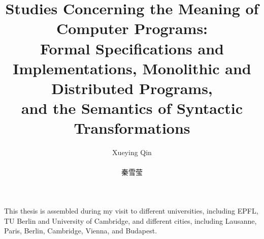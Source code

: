 \documentclass[phd,icsa,twoside,logo]{infthesis}
\title{Studies Concerning the Meaning of Computer Programs:\\\smaller Formal Specifications and Implementations, Monolithic and Distributed Programs,\\and the Semantics of Syntactic Transformations}
\author{Xueying Qin \\ \begin{CJK*}{UTF8}{gbsn}秦雪莹\end{CJK*}}
\begin{document}
\begin{preliminary}

\maketitle
\begin{laysummary}

\end{laysummary}


\begin{acknowledgements}
This thesis is assembled during my visit to different universities, including EPFL, TU Berlin and University of Cambridge, and different cities, including Lausanne, Paris, Berlin, Cambridge, Vienna, and Budapest.


\end{acknowledgements}

\standarddeclaration


\tableofcontents


\end{preliminary}







% 

\appendix







\end{document}
